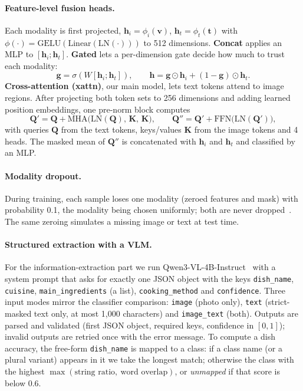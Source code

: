 \documentclass[11pt,a4paper]{article}
\begin{document}
\paragraph{Feature-level fusion heads.}
Each modality is first projected, $\mathbf{h}_i = \phi_i(\mathbf{v})$, $\mathbf{h}_t=\phi_t(\mathbf{t})$ with
$\phi(\cdot)=\mathrm{GELU}(\mathrm{Linear}(\mathrm{LN}(\cdot)))$ to 512 dimensions.
\textbf{Concat} applies an MLP to $[\mathbf{h}_i;\mathbf{h}_t]$. \textbf{Gated} lets a per-dimension gate decide how
much to trust each modality:
\begin{equation}
  \mathbf{g}=\sigma\!\left(W[\mathbf{h}_i;\mathbf{h}_t]\right),\qquad
  \mathbf{h}=\mathbf{g}\odot\mathbf{h}_i+(1-\mathbf{g})\odot\mathbf{h}_t .
\end{equation}
\textbf{Cross-attention (xattn)}, our main model, lets text tokens attend to image regions. After projecting both
token sets to 256 dimensions and adding learned position embeddings, one pre-norm block computes
\begin{equation}
  \mathbf{Q}' = \mathbf{Q} + \mathrm{MHA}\big(\mathrm{LN}(\mathbf{Q}),\,\mathbf{K},\,\mathbf{K}\big),\qquad
  \mathbf{Q}'' = \mathbf{Q}' + \mathrm{FFN}\big(\mathrm{LN}(\mathbf{Q}')\big),
\end{equation}
with queries $\mathbf{Q}$ from the text tokens, keys/values $\mathbf{K}$ from the image tokens and 4 heads. The
masked mean of $\mathbf{Q}''$ is concatenated with $\mathbf{h}_i$ and $\mathbf{h}_t$ and classified by an MLP.

\paragraph{Modality dropout.}
During training, each sample loses one modality (zeroed features and mask) with probability 0.1, the modality
being chosen uniformly; both are never dropped~\cite{neverova2016moddrop}. The same zeroing simulates a missing
image or text at test time.

\paragraph{Structured extraction with a VLM.}
For the information-extraction part we run Qwen3-VL-4B-Instruct~\cite{qwen3vl} with a system prompt that asks for
exactly one JSON object with the keys \texttt{dish\_name}, \texttt{cuisine}, \texttt{main\_ingredients} (a list),
\texttt{cooking\_method} and \texttt{confidence}. Three input
modes mirror the classifier comparison: \texttt{image} (photo only), \texttt{text} (strict-masked text only, at most
1,000 characters) and \texttt{image\_text} (both). Outputs are parsed and validated (first JSON object, required
keys, confidence in $[0,1]$); invalid outputs are retried once with the error message. To compute a dish accuracy,
the free-form \texttt{dish\_name} is mapped to a class: if a class name (or a plural variant) appears in it we take
the longest match; otherwise the class with the highest $\max(\text{string ratio},\ \text{word overlap})$, or
\emph{unmapped} if that score is below 0.6.
\end{document}
